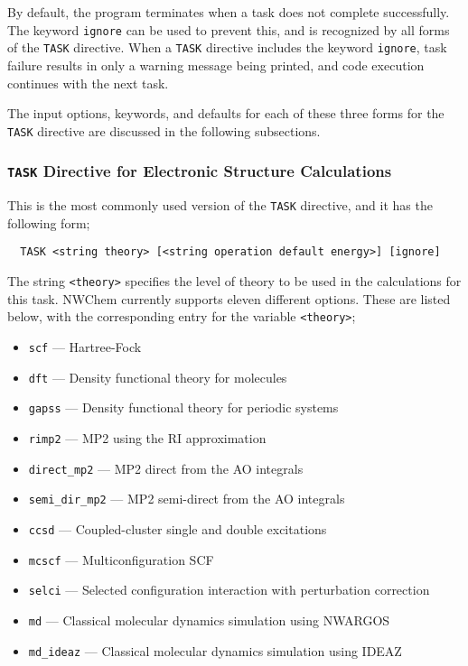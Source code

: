 By default, the program terminates when a task does not complete
successfully.  The keyword \verb+ignore+ can be used to prevent this,
and is recognized by all forms of the \verb+TASK+ directive.  When a
\verb+TASK+ directive includes the keyword \verb+ignore+, task failure
results in only a warning message being printed, and code execution
continues with the next task.

The input options, keywords, and defaults for each of
these three forms for the \verb+TASK+ directive are discussed in the
following subsections.

\subsubsection{{\tt TASK} Directive for Electronic Structure Calculations}

This is the most commonly used version of the \verb+TASK+ directive, and
it has the following form;

\begin{verbatim}
  TASK <string theory> [<string operation default energy>] [ignore]
\end{verbatim}

The string \verb+<theory>+ specifies the level of theory to be used in the
calculations for this task.  NWChem currently supports eleven different
options.  These are listed below, with the corresponding entry for 
the variable {\tt <theory>};
\begin{itemize}
 \item \verb+scf+ --- Hartree-Fock
 \item \verb+dft+ --- Density functional theory for molecules
 \item \verb+gapss+ --- Density functional theory for periodic systems
 \item \verb+rimp2+ --- MP2 using the RI approximation
 \item \verb+direct_mp2+ --- MP2 direct from the AO integrals
 \item \verb+semi_dir_mp2+ --- MP2 semi-direct from the AO integrals
 \item \verb+ccsd+ --- Coupled-cluster single and double excitations
 \item \verb+mcscf+ --- Multiconfiguration SCF
 \item \verb+selci+ --- Selected configuration interaction with perturbation
   correction 
 \item \verb+md+ --- Classical molecular dynamics simulation using NWARGOS
 \item \verb+md_ideaz+ --- Classical molecular dynamics simulation
   using IDEAZ
\end{itemize}


